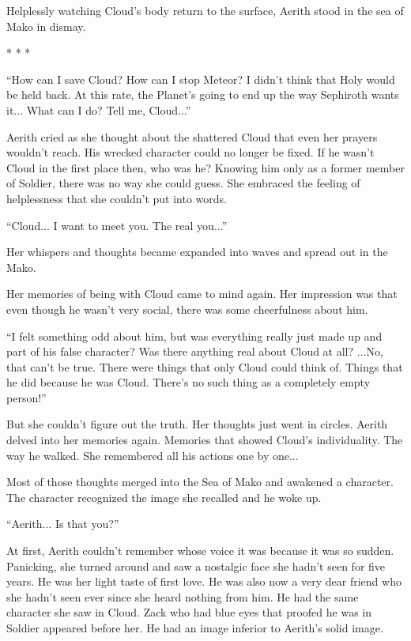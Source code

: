 \documentclass[oneside]{book}
\begin{document}
Helplessly watching Cloud's body return to the surface, Aerith stood in the sea of Mako in dismay.

* * *

“How can I save Cloud? How can I stop Meteor? I didn't think that Holy would be held back. At this rate, the Planet's going to end up the way Sephiroth wants it... What can I do? Tell me, Cloud...”

Aerith cried as she thought about the shattered Cloud that even her prayers wouldn't reach. His wrecked character could no longer be fixed. If he wasn't Cloud in the first place then, who was he? Knowing him only as a former member of Soldier, there was no way she could guess. She embraced the feeling of helplessness that she couldn't put into words.

“Cloud... I want to meet you. The real you...”

Her whispers and thoughts became expanded into waves and spread out in the Mako.

Her memories of being with Cloud came to mind again. Her impression was that even though he wasn't very social, there was some cheerfulness about him.

“I felt something odd about him, but was everything really just made up and part of his false character? Was there anything real about Cloud at all? ...No, that can't be true. There were things that only Cloud could think of. Things that he did because he was Cloud. There's no such thing as a completely empty person!”

But she couldn't figure out the truth. Her thoughts just went in circles. Aerith delved into her memories again. Memories that showed Cloud's individuality. The way he walked. She remembered all his actions one by one...

Most of those thoughts merged into the Sea of Mako and awakened a character. The character recognized the image she recalled and he woke up.

“Aerith... Is that you?”

At first, Aerith couldn't remember whose voice it was because it was so sudden. Panicking, she turned around and saw a nostalgic face she hadn't seen for five years. He was her light taste of first love. He was also now a very dear friend who she hadn't seen ever since she heard nothing from him. He had the same character she saw in Cloud. Zack who had blue eyes that proofed he was in Soldier appeared before her. He had an image inferior to Aerith's solid image.
\end{document}

